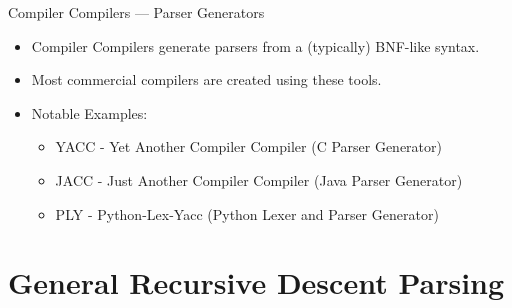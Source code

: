 \documentclass[handout]{beamer}
\newenvironment{code}{%
 \VerbatimEnvironment
 \begin{adjustbox}{max width=\textwidth, max height=0.7\textheight}
 \begin{BVerbatim}
  }{
  \end{BVerbatim}
 \end{adjustbox}
}
\begin{document}
\begin{frame}{Compiler Compilers --- Parser Generators}
    \begin{itemize}
        \item Compiler Compilers generate parsers from a (typically) BNF-like syntax.
        \item Most commercial compilers are created using these tools.
        \item Notable Examples:
        \begin{itemize}
            \item YACC - Yet Another Compiler Compiler (C Parser Generator)
            \item JACC - Just Another Compiler Compiler (Java Parser Generator)
            \item PLY - Python-Lex-Yacc (Python Lexer and Parser Generator)
        \end{itemize}
    \end{itemize}
\end{frame}


\section{General Recursive Descent Parsing}
\end{document}
